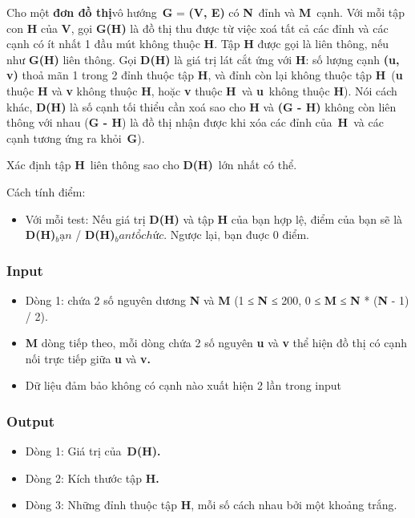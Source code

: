 

Cho một \textbf{đơn đồ thị}vô hướng \textbf{G} = \textbf{(V, E)} có \textbf{N} đỉnh và \textbf{M} cạnh. Với mỗi tập con \textbf{H} của \textbf{V}, gọi \textbf{G(H)} là đồ thị thu được từ việc xoá tất cả các đỉnh và các cạnh có ít nhất 1 đầu mút không thuộc \textbf{H}. Tập \textbf{H} được gọi là liên thông, nếu như \textbf{G(H)} liên thông. Gọi \textbf{D(H)} là giá trị lát cắt ứng với \textbf{H}: số lượng cạnh \textbf{(u, v)} thoả mãn 1 trong 2 đỉnh thuộc tập \textbf{H}, và đỉnh còn lại không thuộc tập \textbf{H} (\textbf{u} thuộc \textbf{H} và \textbf{v} không thuộc \textbf{H}, hoặc \textbf{v} thuộc \textbf{H} và \textbf{u} không thuộc \textbf{H}). Nói cách khác, \textbf{D(H)} là số cạnh tối thiểu cần xoá sao cho \textbf{H} và \textbf{(G - H) }không còn liên thông với nhau (\textbf{G - H}) là đồ thị nhận được khi xóa các đỉnh của \textbf{H} và các cạnh tương ứng ra khỏi \textbf{G}).

Xác định tập \textbf{H} liên thông sao cho \textbf{D(H)} lớn nhất có thể.

Cách tính điểm:
\begin{itemize}
	\item Với mỗi test: Nếu giá trị \textbf{D(H)} và tập \textbf{H} của bạn hợp lệ, điểm của bạn sẽ là \textbf{D(H)}$_bạn$ / \textbf{D(H)}$_ban tổ chức$. Ngược lại, bạn đuợc 0 điểm.
\end{itemize}

\subsubsection{Input}
\begin{itemize}
	\item Dòng 1: chứa 2 số nguyên dương \textbf{N} và \textbf{M} (1 ≤ \textbf{N} ≤ 200, 0 ≤ \textbf{M} ≤ \textbf{N} * (\textbf{N} - 1) / 2).
	\item \textbf{M} dòng tiếp theo, mỗi dòng chứa 2 số nguyên \textbf{u} và \textbf{v} thể hiện đồ thị có cạnh nối trực tiếp giữa \textbf{u} và \textbf{v}\textbf{.}
	\item Dữ liệu đảm bảo không có cạnh nào xuất hiện 2 lần trong input\textbf{
}
\end{itemize}

\subsubsection{Output}
\begin{itemize}
	\item Dòng 1: Giá trị của \textbf{D(H)}\textbf{.}
	\item Dòng 2: Kích thước tập \textbf{H}\textbf{.}
	\item Dòng 3: Những đỉnh thuộc tập \textbf{H}, mỗi số cách nhau bởi một khoảng trắng.
\end{itemize}

